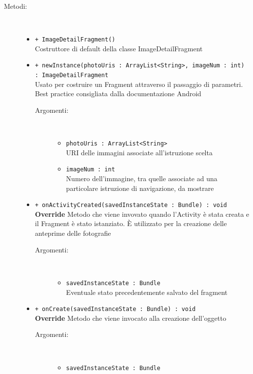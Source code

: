\documentclass[../DefinizioneDiProdotto.tex]{subfiles}
\begin{document}
\begin{description}
\begin{itemize}
	\end{itemize}
	\item[Metodi:] \
	\begin{itemize}
		\item \texttt{+ ImageDetailFragment()}\\
		Costruttore di default della classe ImageDetailFragment
		\item \texttt{+ newInstance(photoUris : ArrayList<String>, imageNum : int) : ImageDetailFragment}\\
		Usato per costruire un Fragment attraverso il passaggio di parametri. Best practice consigliata dalla documentazione Android
		\begin{description}
			\item[Argomenti:] \
			\begin{itemize}
				\item \texttt{photoUris : ArrayList<String>}\\
				URI delle immagini associate all'istruzione scelta\item \texttt{imageNum : int}\\
				Numero dell'immagine, tra quelle associate ad una particolare istruzione di navigazione, da mostrare\end{itemize}
		\end{description}
		\item \texttt{+ onActivityCreated(savedInstanceState : Bundle) : void}\\
		\textbf{Override} Metodo che viene invovato quando l'Activity è stata creata e il Fragment è stato istanziato. È utilizzato per la creazione delle anteprime delle fotografie
		\begin{description}
			\item[Argomenti:] \
			\begin{itemize}
				\item \texttt{savedInstanceState : Bundle}\\
				Eventuale stato precedentemente salvato del fragment\end{itemize}
		\end{description}
		\item \texttt{+ onCreate(savedInstanceState : Bundle) : void}\\
		\textbf{Override} Metodo che viene invocato alla creazione dell'oggetto
		\begin{description}
			\item[Argomenti:] \
			\begin{itemize}
				\item \texttt{savedInstanceState : Bundle}\\

\end{itemize}
\end{description}
\end{itemize}
\end{description}
\end{document}
